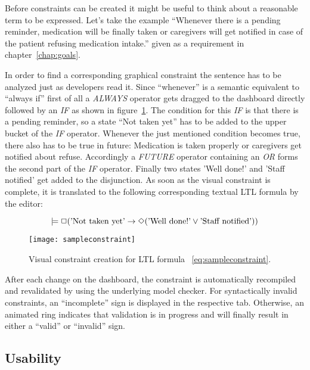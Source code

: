 Before constraints can be created it might be useful to think about a reasonable term to be expressed. Let's take the example ``Whenever there is a pending reminder, medication will be finally taken or caregivers will get notified in case of the patient refusing medication intake.'' given as a requirement in chapter~\ref{chap:goals}.

In order to find a corresponding graphical constraint the sentence has to be analyzed just as developers read it. Since ``whenever'' is a semantic equivalent to ``always if'' first of all a \emph{ALWAYS} operator gets dragged to the dashboard directly followed by an \emph{IF} as shown in figure~\ref{fig:sampleconstraint}. The condition for this \emph{IF} is that there is a pending reminder, so a state ``Not taken yet'' has to be added to the upper bucket of the \emph{IF} operator.
Whenever the just mentioned condition becomes true, there also has to be true in future: Medication is taken properly or caregivers get notified about refuse. Accordingly a \emph{FUTURE} operator containing an \emph{OR} forms the second part of the \emph{IF} operator. Finally two states 'Well done!' and 'Staff notified' get added to the disjunction.
As soon as the visual constraint is complete, it is translated to the following corresponding textual LTL formula by the editor:

\begin{equation} \label{eq:sampleconstraint}
  \models \Box (\textnormal{'Not taken yet'} \rightarrow \Diamond (\textnormal{'Well done!'} \vee \textnormal{'Staff notified'}))
\end{equation}

\begin{figure}[htbp]
  \centering
  \texttt{[image: sampleconstraint]}
  \caption{Visual constraint creation for LTL formula ~\ref{eq:sampleconstraint}.}
  \label{fig:sampleconstraint}
\end{figure}

After each change on the dashboard, the constraint is automatically recompiled and revalidated by using the underlying model checker. For syntactically invalid constraints, an ``incomplete'' sign is displayed in the respective tab. Otherwise, an animated ring indicates that validation is in pro\-gress and will finally result in either a ``valid'' or ``invalid'' sign.



\subsection{Usability}

